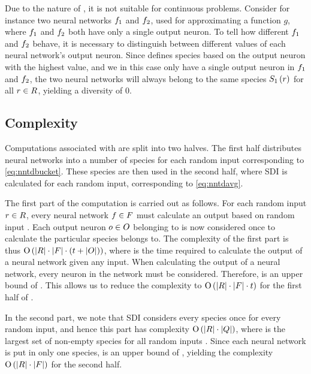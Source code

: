 Due to the nature of \dia, it is not suitable for continuous problems. Consider for instance two neural networks $f_1$ and $f_2$, used for approximating a function $g$, where $f_1$ and $f_2$ both have only a single output neuron. To tell how different $f_1$ and $f_2$ behave, it is necessary to distinguish between different values of each neural network's output neuron. Since \dia{} defines species based on the output neuron with the highest value, and we in this case only have a single output neuron in $f_1$ and $f_2$, the two neural networks will always belong to the same species $S_{1}\left(r\right)$ for all $r \in R$, yielding a diversity of 0.  

\subsection{Complexity}
Computations associated with \dia{} are split into two halves. The first half distributes neural networks into a number of species for each random input corresponding to \cref{eq:nntdbucket}. These species are then used in the second half, where SDI is calculated for each random input, corresponding to \cref{eq:nntdavg}.

The first part of the computation is carried out as follows. For each random input $r \in R$, every neural network $f \in F$ must calculate an output based on random input \ran. Each output neuron $o \in O$ belonging to \ind{} is now considered once to calculate the particular species \ind{} belongs to. The complexity of the first part is thus $\operatorname{O}\left(\lvert R\rvert \cdot \lvert F\rvert \cdot \left(t + \lvert O\rvert\right)\right)$, where \timet{} is the time required to calculate the output of a neural network given any input. When calculating the output of a neural network, every neuron in the network must be considered. Therefore, \timet{} is an upper bound of \nnoutsetl. This allows us to reduce the complexity to $\operatorname{O}\left(\lvert R\rvert \cdot \lvert F\rvert \cdot t\right)$ for the first half of \dia.

In the second part, we note that SDI considers every species once for every random input, and hence this part has complexity $\operatorname{O}\left(\lvert R\rvert\cdot\lvert Q\rvert\right)$, where \nemptyspeciesset{} is the largest set of non-empty species for all random inputs \ranset. Since each neural network is put in only one species, \indsetl{} is an upper bound of \nemptyspeciessetl, yielding the complexity $\operatorname{O}\left(\lvert R\rvert\cdot\lvert F\rvert\right)$ for the second half.

